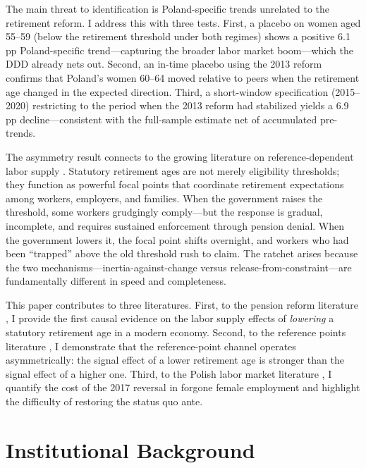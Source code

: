 \documentclass[12pt]{article}
\begin{document}
The main threat to identification is Poland-specific trends unrelated to the retirement reform. I address this with three tests. First, a placebo on women aged 55--59 (below the retirement threshold under both regimes) shows a positive 6.1 pp Poland-specific trend---capturing the broader labor market boom---which the DDD already nets out. Second, an in-time placebo using the 2013 reform confirms that Poland's women 60--64 moved relative to peers when the retirement age changed in the expected direction. Third, a short-window specification (2015--2020) restricting to the period when the 2013 reform had stabilized yields a 6.9 pp decline---consistent with the full-sample estimate net of accumulated pre-trends.

The asymmetry result connects to the growing literature on reference-dependent labor supply \citep{seibold2021reference,rablen2021loss}. Statutory retirement ages are not merely eligibility thresholds; they function as powerful focal points that coordinate retirement expectations among workers, employers, and families. When the government raises the threshold, some workers grudgingly comply---but the response is gradual, incomplete, and requires sustained enforcement through pension denial. When the government lowers it, the focal point shifts overnight, and workers who had been ``trapped'' above the old threshold rush to claim. The ratchet arises because the two mechanisms---inertia-against-change versus release-from-constraint---are fundamentally different in speed and completeness.

This paper contributes to three literatures. First, to the pension reform literature \citep{gruber1999social,borsch2018does}, I provide the first causal evidence on the labor supply effects of \textit{lowering} a statutory retirement age in a modern economy. Second, to the reference points literature \citep{seibold2021reference,kleven2013bunching}, I demonstrate that the reference-point channel operates asymmetrically: the signal effect of a lower retirement age is stronger than the signal effect of a higher one. Third, to the Polish labor market literature \citep{chlon2012reversal,bielecki2016decreasing}, I quantify the cost of the 2017 reversal in forgone female employment and highlight the difficulty of restoring the status quo ante.


\section{Institutional Background}
\end{document}
